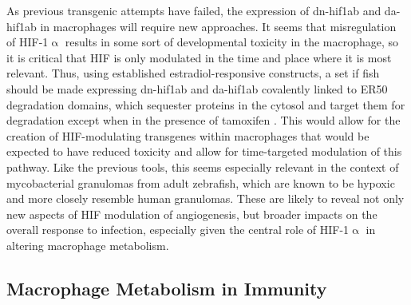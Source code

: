 As previous transgenic attempts have failed, the expression of dn-hif1ab and da-hif1ab in macrophages will require new approaches. It seems that misregulation of HIF-1$\upalpha$ results in some sort of developmental toxicity in the macrophage, so it is critical that HIF is only modulated in the time and place where it is most relevant. Thus, using established estradiol-responsive constructs, a set if fish should be made expressing dn-hif1ab and da-hif1ab covalently linked to ER50 degradation domains, which sequester proteins in the cytosol and target them for degradation except when in the presence of tamoxifen \citep{Miyazaki2012}. This would allow for the creation of HIF-modulating transgenes within macrophages that would be expected to have reduced toxicity and allow for time-targeted modulation of this pathway. Like the previous tools, this seems especially relevant in the context of mycobacterial granulomas from adult zebrafish, which are known to be hypoxic and more closely resemble human granulomas. These are likely to reveal not only new aspects of HIF modulation of angiogenesis, but broader impacts on the overall response to infection, especially given the central role of HIF-1$\upalpha$ in altering macrophage metabolism.

\subsection{Macrophage Metabolism in Immunity}


